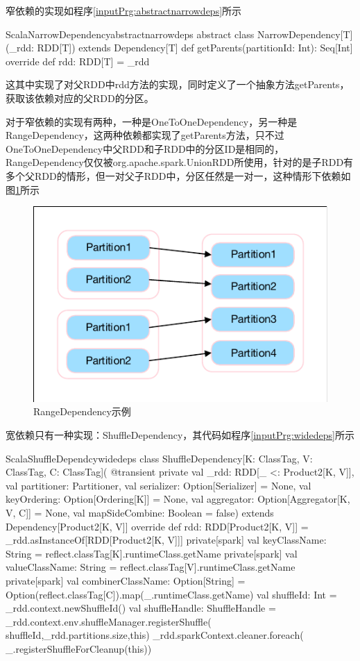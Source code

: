 窄依赖的实现如程序\ref{inputPrg:abstractnarrowdeps}所示
\begin{codeInput}{Scala}{NarrowDependency}{abstractnarrowdeps}
abstract class NarrowDependency[T](_rdd: RDD[T]) extends Dependency[T] {
  def getParents(partitionId: Int): Seq[Int]
  override def rdd: RDD[T] = _rdd
}
\end{codeInput}
这其中实现了对父RDD中rdd方法的实现，同时定义了一个抽象方法getParents，获取该依赖对应的父RDD的分区。

对于窄依赖的实现有两种，一种是OneToOneDependency，另一种是RangeDependency，这两种依赖都实现了getParents方法，只不过OneToOneDependency中父RDD和子RDD中的分区ID是相同的，RangeDependency仅仅被org.apache.spark.UnionRDD所使用，针对的是子RDD有多个父RDD的情形，但一对父子RDD中，分区任然是一对一，这种情形下依赖如图\ref{fig:rangedeps}所示
\begin{figure}[H] 
	\centering
	\includegraphics[scale=1.5]{figures/rangedeps.pdf}
	\caption{RangeDependency示例}
	\label{fig:rangedeps}
\end{figure}

宽依赖只有一种实现：ShuffleDependency，其代码如程序\ref{inputPrg:widedeps}所示
\begin{codeInput}{Scala}{ShuffleDependcy}{widedeps}
class ShuffleDependency[K: ClassTag, V: ClassTag, C: ClassTag](
  @transient private val _rdd: RDD[_ <: Product2[K, V]],
  val partitioner: Partitioner,
  val serializer: Option[Serializer] = None,
  val keyOrdering: Option[Ordering[K]] = None,
  val aggregator: Option[Aggregator[K, V, C]] = None,
  val mapSideCombine: Boolean = false)
    extends Dependency[Product2[K, V]] {	
      override def rdd: RDD[Product2[K, V]] = _rdd.asInstanceOf[RDD[Product2[K, V]]]
      private[spark] val keyClassName: String = reflect.classTag[K].runtimeClass.getName
      private[spark] val valueClassName: String = reflect.classTag[V].runtimeClass.getName
      private[spark] val combinerClassName: Option[String] =
      Option(reflect.classTag[C]).map(_.runtimeClass.getName)	
      val shuffleId: Int = _rdd.context.newShuffleId()
      val shuffleHandle: ShuffleHandle =
       _rdd.context.env.shuffleManager.registerShuffle(
        shuffleId,_rdd.partitions.size,this)
      _rdd.sparkContext.cleaner.foreach(
        _.registerShuffleForCleanup(this))
}
\end{codeInput}


